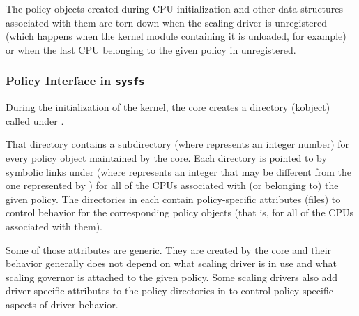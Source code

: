 \documentclass[a4paper,8pt,english]{sphinxmanual}
\begin{document}
The policy objects created during CPU initialization and other data structures
associated with them are torn down when the scaling driver is unregistered
(which happens when the kernel module containing it is unloaded, for example) or
when the last CPU belonging to the given policy in unregistered.


\subsubsection{Policy Interface in \texttt{sysfs}}
\label{admin-guide/pm/cpufreq:policy-interface-in-sysfs}
During the initialization of the kernel, the  core creates a
 directory (kobject) called  under
.

That directory contains a  subdirectory (where  represents an
integer number) for every policy object maintained by the  core.
Each  directory is pointed to by  symbolic links
under  (where  represents an integer
that may be different from the one represented by ) for all of the CPUs
associated with (or belonging to) the given policy.  The  directories
in  each contain policy-specific
attributes (files) to control  behavior for the corresponding policy
objects (that is, for all of the CPUs associated with them).

Some of those attributes are generic.  They are created by the  core
and their behavior generally does not depend on what scaling driver is in use
and what scaling governor is attached to the given policy.  Some scaling drivers
also add driver-specific attributes to the policy directories in  to
control policy-specific aspects of driver behavior.
\end{document}
